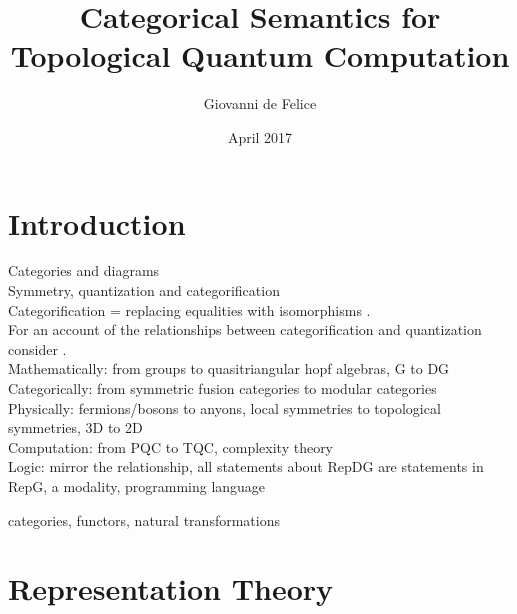 \documentclass{article}
\title{Categorical Semantics for Topological Quantum Computation}
\author{Giovanni de Felice}
\date{April 2017}
\newenvironment{definition}[1][Definition]{\begin{trivlist}
\item[\hskip \labelsep {\bfseries #1}]}{\end{trivlist}}
\begin{document}
\maketitle
\tableofcontents

\pagebreak
\section{Introduction}
Categories and diagrams \\
Symmetry, quantization and categorification \\
Categorification = replacing equalities with isomorphisms \cite{Baez98}.\\
For an account of the relationships between categorification and quantization consider \cite{Rowell17}.\\
Mathematically: from groups to quasitriangular hopf algebras, G to DG\\
Categorically: from symmetric fusion categories to modular categories\\
Physically: fermions/bosons to anyons, local symmetries to topological symmetries, 3D to 2D\\
Computation: from PQC to TQC, complexity theory\\
Logic: mirror the relationship, all statements about RepDG are statements in RepG, a modality, programming language
\begin{definition}
categories, functors, natural transformations
\end{definition}
\section{Representation Theory}
\end{document}
